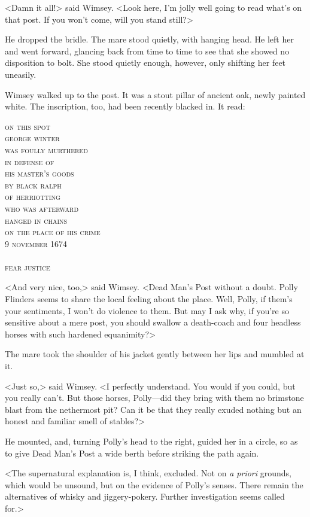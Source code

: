<Damn it all!> said Wimsey. <Look here, I'm jolly well going to read what's on that post. If you won't come, will you stand still?>

He dropped the bridle. The mare stood quietly, with hanging head. He left her and went forward, glancing back from time to time to see that she showed no disposition to bolt. She stood quietly enough, however, only shifting her feet uneasily.

Wimsey walked up to the post. It was a stout pillar of ancient oak, newly painted white. The inscription, too, had been recently blacked in. It read:

\begin{center}\scshape
on this spot\\
george winter\\
was foully murthered\\
in defense of\\
his master's goods\\
by black ralph\\
of herriotting\\
who was afterward\\
hanged in chains\\
on the place of his crime\\
9 november 1674\\
~\\
fear justice
\end{center}

<And very nice, too,> said Wimsey. <Dead Man's Post without a doubt. Polly Flinders seems to share the local feeling about the place. Well, Polly, if them's your sentiments, I won't do violence to them. But may I ask why, if you're so sensitive about a mere post, you should swallow a death-coach and four headless horses with such hardened equanimity?>

The mare took the shoulder of his jacket gently between her lips and mumbled at it.

<Just so,> said Wimsey. <I perfectly understand. You would if you could, but you really can't. But those horses, Polly—did they bring with them no brimstone blast from the nethermost pit? Can it be that they really exuded nothing but an honest and familiar smell of stables?>

He mounted, and, turning Polly's head to the right, guided her in a circle, so as to give Dead Man's Post a wide berth before striking the path again.

<The supernatural explanation is, I think, excluded. Not on \textit{a priori} grounds, which would be unsound, but on the evidence of Polly's senses. There remain the alternatives of whisky and jiggery-pokery. Further investigation seems called for.>

